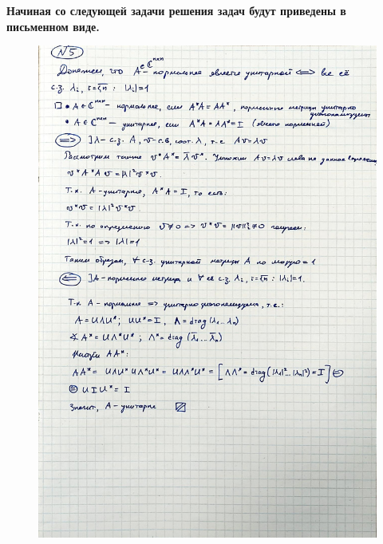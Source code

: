 \documentclass{article}
\begin{document}
	\textbf{Начиная со следующей задачи решения задач будут приведены в письменном виде.}
	
	\begin{figure}[h!]
		\includegraphics[width=0.95\linewidth]{handwritten/matcomp_hw1_5}
	\end{figure}
	
\end{document}

